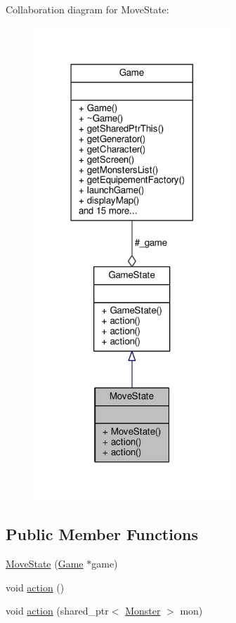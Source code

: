 Collaboration diagram for Move\-State\-:
\nopagebreak
\begin{figure}[H]
\begin{center}
\leavevmode
\includegraphics[width=210pt]{class_move_state__coll__graph}
\end{center}
\end{figure}
\subsection*{Public Member Functions}
\begin{DoxyCompactItemize}
\item 
\hyperlink{class_move_state_a61b0f383d0f07876c62a6f11bb57b360}{Move\-State} (\hyperlink{class_game}{Game} $\ast$game)
\item 
void \hyperlink{class_move_state_acacfc371779484593b6d19370d358b8c}{action} ()
\item 
void \hyperlink{class_move_state_ad6e5d56d2634aa592c8e5fdc32fd0ce7}{action} (shared\-\_\-ptr$<$ \hyperlink{class_monster}{Monster} $>$ mon)
\end{DoxyCompactItemize}
